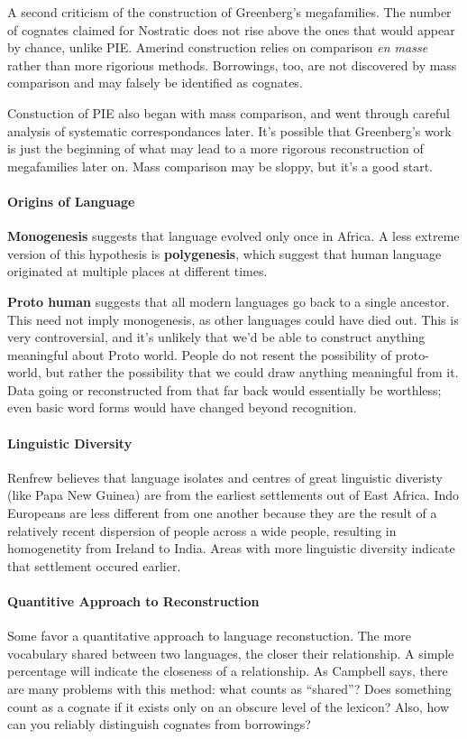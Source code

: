 \documentclass{exam}
\begin{document}
A second criticism of the construction of Greenberg's megafamilies. 
The number of cognates claimed for Nostratic does not rise above the ones that would appear by chance, unlike PIE. 
Amerind construction relies on comparison \textit{en masse} rather than more rigorious methods. 
Borrowings, too, are not discovered by mass comparison and may falsely be identified as cognates. 

Constuction of PIE also began with mass comparison, and went through careful analysis of systematic correspondances later. 
It's possible that Greenberg's work is just the beginning of what may lead to a more rigorous reconstruction of megafamilies later on. 
Mass comparison may be sloppy, but it's a good start. 


\paragraph{Origins of Language}
\textbf{Monogenesis} suggests that language evolved only once in Africa. 
A less extreme version of this hypothesis is \textbf{polygenesis}, which suggest that human language originated at multiple places at different times.

\textbf{Proto human} suggests that all modern languages go back to a single ancestor. 
This need not imply monogenesis, as other languages could have died out.
This is very controversial, and it's unlikely that we'd be able to construct anything meaningful about Proto world. 
People do not resent the possibility of proto-world, but rather the possibility that we could draw anything meaningful from it. 
Data going or reconstructed from that far back would essentially be worthless; even basic word forms would have changed beyond recognition. 




\paragraph{Linguistic Diversity}Renfrew believes that language isolates and centres of great linguistic diveristy (like Papa New Guinea) are from the earliest settlements out of East Africa. 
Indo Europeans are less different from one another because they are the result of a relatively recent dispersion of people across a wide people, resulting in homogenetity from Ireland to India. 
Areas with more linguistic diversity indicate that settlement occured earlier. 


\paragraph{Quantitive Approach to Reconstruction} Some favor a quantitative approach to language reconstuction.
The more vocabulary shared between two languages, the closer their relationship. 
A simple percentage will indicate the closeness of a relationship. 
As Campbell says, there are many problems with this method: what counts as ``shared''? 
Does something count as a cognate if it exists only on an obscure level of the lexicon?
Also, how can you reliably distinguish cognates from borrowings?
\end{document}
